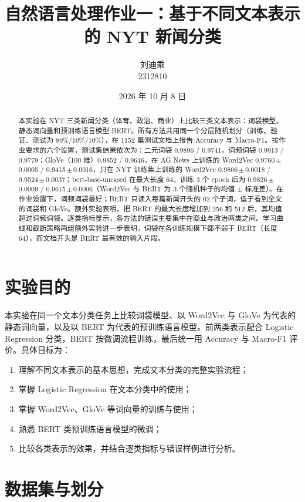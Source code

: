 \documentclass[lang=cn,a4paper]{elegantpaper}
\title{自然语言处理作业一：基于不同文本表示的 NYT 新闻分类}
\author{刘迪乘 \\ 2312810}
\institute{自然语言处理（2026 年秋季）}
\date{2026 年 10 月 8 日}
\newcommand{\pmstd}[2]{#1\,$\pm$\,#2}
\begin{document}
\maketitle

\begin{abstract}
本实验在 NYT 三类新闻分类（体育、政治、商业）上比较三类文本表示：词袋模型、静态词向量和预训练语言模型 BERT。所有方法共用同一个分层随机划分（训练、验证、测试为 80\%/10\%/10\%），在 1152 篇测试文档上报告 Accuracy 与 Macro-F1。按作业要求的六个设置，测试集结果依次为：二元词袋 0.9896 / 0.9741，词频词袋 0.9913 / 0.9779；GloVe（100 维）0.9852 / 0.9646，在 AG News 上训练的 Word2Vec \pmstd{0.9760}{0.0005} / \pmstd{0.9415}{0.0016}，只在 NYT 训练集上训练的 Word2Vec \pmstd{0.9806}{0.0018} / \pmstd{0.9524}{0.0037}；bert-base-uncased 在最大长度 64、训练 3 个 epoch 后为 \pmstd{0.9826}{0.0009} / \pmstd{0.9615}{0.0006}（Word2Vec 与 BERT 为 3 个随机种子的均值 $\pm$ 标准差）。在作业设置下，词频词袋最好；BERT 只读入每篇新闻开头的 62 个子词，低于看到全文的词袋和 GloVe。额外实验表明，把 BERT 的最大长度增加到 256 和 512 后，其均值超过词频词袋。逐类指标显示，各方法的错误主要集中在商业与政治两类之间。学习曲线和截断策略两组额外实验进一步表明，词袋在各训练规模下都不弱于 BERT（长度 64），而文档开头是 BERT 最有效的输入片段。
\end{abstract}

\section{实验目的}

本实验在同一个文本分类任务上比较词袋模型、以 Word2Vec 与 GloVe 为代表的静态词向量，以及以 BERT 为代表的预训练语言模型。前两类表示配合 Logistic Regression 分类，BERT 按微调流程训练，最后统一用 Accuracy 与 Macro-F1 评价。具体目标为：
\begin{enumerate}
  \item 理解不同文本表示的基本思想，完成文本分类的完整实验流程；
  \item 掌握 Logistic Regression 在文本分类中的使用；
  \item 掌握 Word2Vec、GloVe 等词向量的训练与使用；
  \item 熟悉 BERT 类预训练语言模型的微调；
  \item 比较各类表示的效果，并结合逐类指标与错误样例进行分析。
\end{enumerate}

\section{数据集与划分}
\label{sec:data}
\end{document}
